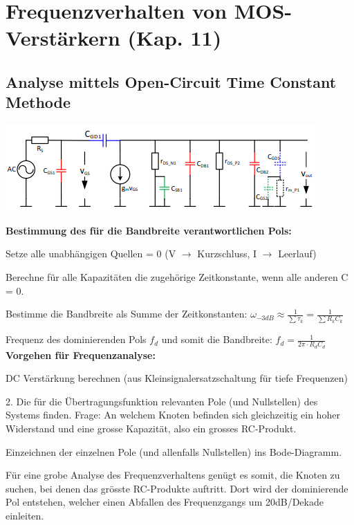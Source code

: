 
\section{Frequenzverhalten von MOS-Verstärkern (Kap. 11)}
\subsection{Analyse mittels Open-Circuit Time Constant Methode} 
\begin{minipage}[c]{0.5\textwidth}
	\includegraphics[width=1\linewidth]{chapters/Frequenzverhalten/images/parasitaere_kapazitaeten}
\end{minipage}
\begin{minipage}[c]{0.5\textwidth}
\textbf{Bestimmung des für die Bandbreite verantwortlichen Pols:}
\begin{compactenum}
	\item Setze alle unabhängigen Quellen = 0 (V $\rightarrow$ Kurzschluss, I $\rightarrow$ Leerlauf)
	\item Berechne für alle Kapazitäten die zugehörige Zeitkonstante, wenn alle anderen C = 0.
\end{compactenum}
\end{minipage}
\begin{compactenum}
	\setcounter{enumi}{2}
	\item Bestimme die Bandbreite als Summe der Zeitkonstanten: $\omega_{-3dB}\approx \frac{1}{\sum\tau_k}=\frac{1}{\sum R_kC_k}$
\end{compactenum}
Frequenz des dominierenden Pols $f_d$ und somit die Bandbreite: $f_d=\frac{1}{2\pi \cdot R_dC_d}$\\
\textbf{Vorgehen für Frequenzanalyse:}
\begin{compactenum}
	\item DC Verstärkung berechnen (aus Kleinsignalersatzschaltung für tiefe Frequenzen)
	\item 2. Die für die Übertragungsfunktion relevanten Pole (und Nullstellen) des	Systems finden. Frage: An welchem Knoten befinden sich gleichzeitig ein hoher Widerstand und eine grosse Kapazität, also ein grosses RC-Produkt.
	\item Einzeichnen der einzelnen Pole (und allenfalls Nullstellen) ins Bode-Diagramm.
\end{compactenum}
Für eine grobe Analyse des Frequenzverhaltens genügt es somit, die Knoten zu suchen, bei denen das grösste RC-Produkte auftritt. Dort wird der dominierende Pol entstehen, welcher einen Abfallen des Frequenzgangs um 20dB/Dekade einleiten.
